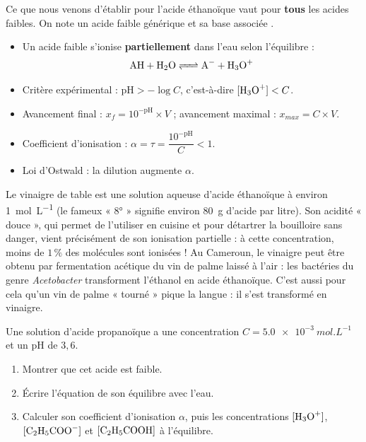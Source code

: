 \documentclass[11pt]{article}
\newcounter{popsec}
\newcounter{popsub}
\newcommand{\courssub}[1]{%
  \stepcounter{popsub}%
  \par\vspace{9pt}\noindent{\popxbold\fontsize{11.5}{13}\selectfont\color{popink}{\color{poporange}\thepopsec.\thepopsub}\hspace{6pt}#1}\par\nopagebreak\vspace{4pt}
}
\begin{document}
\courssub{Généralisation}

Ce que nous venons d'établir pour l'acide éthanoïque vaut pour \textbf{tous} les acides faibles. On note un acide faible générique  et sa base associée .

\begin{aretenir}
\begin{itemize}
\item Un acide faible  s'ionise \textbf{partiellement} dans l'eau selon l'équilibre :
\[ \ce{AH + H2O <=> A- + H3O+} \]
\item Critère expérimental : $\mathrm{pH} > -\log C$, c'est-à-dire $[\ce{H3O+}] < C$.
\item Avancement final : $x_f = 10^{-\mathrm{pH}} \times V$ ; avancement maximal : $x_{max} = C \times V$.
\item Coefficient d'ionisation : $\alpha = \tau = \dfrac{10^{-\mathrm{pH}}}{C} < 1$.
\item Loi d'Ostwald : la dilution augmente $\alpha$.
\end{itemize}
\end{aretenir}

\begin{savaistu}
Le vinaigre de table est une solution aqueuse d'acide éthanoïque à environ \SI{1}{mol.L^{-1}} (le fameux « 8° » signifie environ \SI{80}{g} d'acide par litre). Son acidité « douce », qui permet de l'utiliser en cuisine et pour détartrer la bouilloire sans danger, vient précisément de son ionisation partielle : à cette concentration, moins de $1\,\%$ des molécules sont ionisées ! Au Cameroun, le vinaigre peut être obtenu par fermentation acétique du vin de palme laissé à l'air : les bactéries du genre \emph{Acetobacter} transforment l'éthanol en acide éthanoïque. C'est aussi pour cela qu'un vin de palme « tourné » pique la langue : il s'est transformé en vinaigre.
\end{savaistu}

\begin{exercice}
Une solution d'acide propanoïque  a une concentration $C = \SI{5,0e-3}{mol.L^{-1}}$ et un pH de $3,6$.
\begin{enumerate}
\item Montrer que cet acide est faible.
\item Écrire l'équation de son équilibre avec l'eau.
\item Calculer son coefficient d'ionisation $\alpha$, puis les concentrations $[\ce{H3O+}]$, $[\ce{C2H5COO-}]$ et $[\ce{C2H5COOH}]$ à l'équilibre.
\end{enumerate}
\end{exercice}
\end{document}
